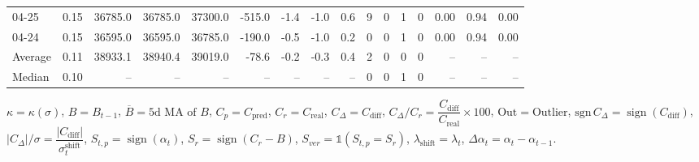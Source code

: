 \begin{threeparttable}
{\begin{tabular}{lrrrrrrrrrrrrrrr}
  04-25 &     0.15 & 36785.0 & 36785.0 & 37300.0 &     -515.0 &           -1.4 &                     -1.0 &                 0.6 &              9 &         0 &     1 &         0 &       0.00 &      0.94 &           0.00 \\
  04-24 &     0.15 & 36595.0 & 36595.0 & 36785.0 &     -190.0 &           -0.5 &                     -1.0 &                 0.2 &              0 &         0 &     1 &         0 &       0.00 &      0.94 &           0.00 \\
Average &     0.11 & 38933.1 & 38940.4 & 39019.0 &      -78.6 &           -0.2 &                     -0.3 &                 0.4 &              2 &         0 &     0 &         0 &         -- &        -- &             -- \\
 Median &     0.10 &      -- &      -- &      -- &         -- &             -- &                       -- &                  -- &              0 &         0 &     1 &         0 &         -- &        -- &             -- \\
\bottomrule
\end{tabular}
}
\begin{tablenotes}\footnotesize
\item $\kappa=\kappa(\sigma)$, $B=B_{t-1}$, $\overline{B}=\text{5d MA of }B$, $C_p=C_{\text{pred}}$, $C_r=C_{\text{real}}$, $C_\Delta=C_{\text{diff}}$, $C_\Delta/C_r=\dfrac{C_{\text{diff}}}{C_{\text{real}}}\times100$, $\mathrm{Out}=\text{Outlier}$, $\mathrm{sgn}\,C_\Delta=\operatorname{sign}(C_{\text{diff}})$, $|C_\Delta|/\sigma=\dfrac{|C_{\text{diff}}|}{\sigma_t^{\text{shift}}}$, $S_{t,p}=\operatorname{sign}(\alpha_t)$, $S_r=\operatorname{sign}(C_r - B)$, $S_{ver}=\mathbb{1}(S_{t,p}=S_r)$, $\lambda_{\text{shift}}=\lambda_t$, $\Delta\alpha_t=\alpha_t-\alpha_{t-1}$.\end{tablenotes}
\end{threeparttable}
\endgroup

